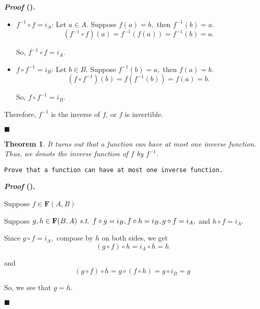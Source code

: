 \documentclass[12pt,a4paper]{article}
\newtheorem{thm}{Theorem}[subsection]
\newcounter{nprf}[subsection]
\newenvironment*{prf}{\par\indent\textbf{\textit{Proof} (\stepcounter{nprf}\thenprf). }\par }{\par\hfill $\blacksquare$\par}
\def\f{f^{-1}}
\def\of{\circ}
\def\F{\mathbf{F}}
\def\st{\emph{ s.t. }}
\begin{document}
\begin{framed}
\begin{prf}
\begin{itemize}
		\item \underline{\textbf{$\f\of f=i_A$}}: Let $a\in A.$ Suppose $f(a)=b,$ then $\f(b)=a.$\[(\f\of f)(a)=\f(f(a))=\f(b)=a.\]\par So, $\f\of f=i_A.$
		\item \underline{\textbf{$f\of\f=i_B$}}: Let $b\in B.$ Suppose $\f(b)=a,$ then $f(a)=b.$\[(f\of\f)(b)=f(\f(b))=f(a)=b.\]\par So, $f\of\f=i_B.$
	\end{itemize}\par Therefore, $\f$ is the inverse of $f$, or $f$ is invertible. 
\end{prf}
\end{framed}
\begin{thm}
It turns out that a function can have at most one inverse function. Thus, we denote \textit{the} inverse function of $f$ by $\f.$	
\end{thm}
\begin{framed}
\noindent\texttt{Prove that a function can have at most one inverse function.}
\begin{prf}
	Suppose $f\in\F(A,B)$\par Suppose $g,h\in\F(B,A)\st f\of g=i_B, f\of h=i_B, g\of f=i_A,$ and $h\of f=i_A.$\par Since $g\of f=i_A,$ compose by $h$ on both sides, we get \[(g\of f)\of h=i_A\of h=h\]\par and \[(g\of f)\of h=g\of(f\of h)=g\of i_B=g\]\par So, we see that $g=h.$
\end{prf}	
\end{framed}
\end{document}
